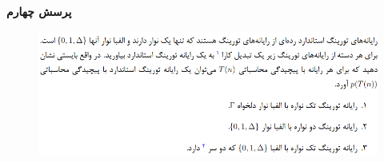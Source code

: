 \textbf{پرسش چهارم}

\begin{figure}[H]
    \centering
    \includegraphics[scale=0.87]{questions/4.png}
\end{figure}